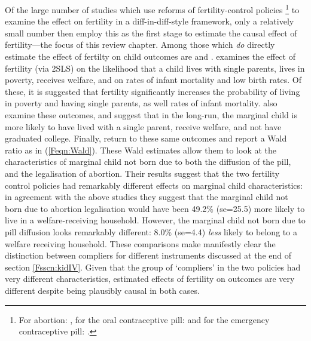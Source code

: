 Of the large number of studies which use reforms of fertility-control policies%
\footnote{For abortion: \citet{Ananatetal2007,Ananatetal2009,AngristEvans1996,
CharlesStephens2006,Cookeetal1999,Currieetal1996,Gruberetal1999,Guldi2008,
KaneStaiger1996,Levineetal1996,Levineetal1996b,Levineetal1999,PopEleches2005,
PopEleches2006}, for the oral contraceptive pill: \citet{OltmansHungerman2012,
Bailey2006,Bailey2011,Bailey2012,Bailey2013,Christensen2012,Goldin2006,
GoldinKatz2002a,GoldinKatz2002b,KearnerLevine2009} and for the emergency 
contraceptive pill: \citet{Durrance2013,Grossetal2014}.} to examine the effect 
on fertility in a 
diff-in-diff-style framework, only a relatively small number then employ this 
as the first stage to estimate the causal effect of fertility---the focus of
this review chapter.  Among those which \emph{do} directly estimate the effect
of fertilty on child outcomes are \citet{Gruberetal1999,Ananatetal2009} and
\citet{OltmansHungerman2012}. \citet{Gruberetal1999} examines the effect of 
fertility (via 2SLS) on the likelihood that a child lives with single parents, 
lives in poverty, receives welfare, and on rates of infant mortality and low 
birth rates.  Of these, it is suggested that fertility significantly increases 
the probability of living in poverty and having single parents, as well rates 
of infant mortality. \citet{Ananatetal2009} also examine these outcomes, and 
suggest that in the long-run, the marginal child is more likely to have lived 
with a single parent, receive welfare, and not have graduated college.
Finally, \citet{OltmansHungerman2012} return to these same outcomes and report
a Wald ratio as in (\ref{Feqn:Wald}).  These Wald estimates allow them to look
at the characteristics of marginal child not born due to both the diffusion of 
the pill, and the legalisation of abortion.  Their results suggest that the two 
fertility control policies had remarkably different effects on marginal child 
characteristics: in agreement with the above studies they suggest that the
marginal child not born due to abortion legalisation would have been 49.2\%
(se=25.5) more likely to live in a welfare-receiving household.  However, the 
marginal child not born due to pill diffusion looks remarkably different: 8.0\% 
(se=4.4) \emph{less} likely to belong to a welfare receiving household.  These 
comparisons make manifestly clear the distinction between compliers for 
different instruments discussed at the end of section \ref{Fsscn:kidIV}.
Given that the group of `compliers' in the two policies had very different
characteristics, estimated effects of fertility on outcomes are very different
despite being plausibly causal in both cases.

